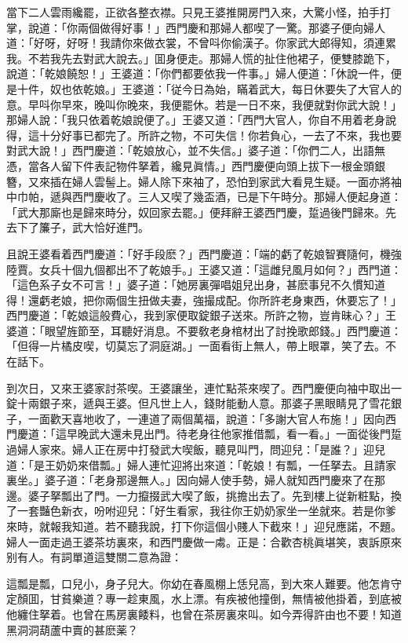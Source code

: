 當下二人雲雨纔罷，正欲各整衣襟。只見王婆推開房門入來，大驚小怪，拍手打掌，說道：「你兩個做得好事！」西門慶和那婦人都喫了一驚。那婆子便向婦人道：「好呀，好呀！我請你來做衣裳，不曾呌你偷漢子。你家武大郎得知，須連累我。不若我先去對武大說去。」囬身便走。那婦人慌的扯住他裙子，便雙膝跪下，說道：「乾娘饒恕！」王婆道：「你們都要依我一件事。」婦人便道：「休說一件，便是十件，奴也依乾娘。」王婆道：「従今日為始，瞞着武大，每日休要失了大官人的意。早呌你早來，晚叫你晚來，我便罷休。若是一日不來，我便就對你武大說！」那婦人說：「我只依着乾娘說便了。」王婆又道：「西門大官人，你自不用着老身說得，這十分好事已都完了。所許之物，不可失信！你若負心，一去了不來，我也要對武大說！」西門慶道：「乾娘放心，並不失信。」婆子道：「你們二人，出語無憑，當各人留下件表記物件拏着，纔見眞情。」西門慶便向頭上拔下一根金頭銀簪，又來插在婦人雲髻上。婦人除下來袖了，恐怕到家武大看見生疑。一面亦將袖中巾帕，遞與西門慶收了。三人又喫了幾盃酒，已是下午時分。那婦人便起身道：「武大那廝也是歸來時分，奴回家去罷。」便拜辭王婆西門慶，踅過後門歸來。先去下了簾子，武大恰好進門。

且說王婆看着西門慶道：「好手段麽？」西門慶道：「端的虧了乾娘智賽隨何，機強陸賈。女兵十個九個都出不了乾娘手。」王婆又道：「這雌兒風月如何？」西門道：「這色系子女不可言！」婆子道：「她房裏彈唱姐兒出身，甚麽事兒不久慣知道得！還虧老娘，把你兩個生扭做夫妻，強撮成配。你所許老身東西，休要忘了！」西門慶道：「乾娘這般費心，我到家便取錠銀子送來。所許之物，豈肯昧心？」王婆道：「眼望旌節至，耳聽好消息。不要敎老身棺材出了討挽歌郎錢。」西門慶道：「但得一片橘皮喫，切莫忘了洞庭湖。」一面看街上無人，帶上眼罩，笑了去。不在話下。

到次日，又來王婆家討茶喫。王婆讓坐，連忙點茶來喫了。西門慶便向袖中取出一錠十兩銀子來，遞與王婆。但凡世上人，錢財能動人意。那婆子黑眼睛見了雪花銀子，一面歡天喜地收了，一連道了兩個萬福，說道：「多謝大官人布施！」因向西門慶道：「這早晚武大還未見出門。待老身往他家推借瓢，看一看。」一面從後門踅過婦人家來。婦人正在房中打發武大喫飯，聽見叫門，問迎兒：「是誰？」迎兒道：「是王奶奶來借瓢。」婦人連忙迎將出來道：「乾娘！有瓢，一任拏去。且請家裏坐。」婆子道：「老身那邊無人。」因向婦人使手勢，婦人就知西門慶來了在那邊。婆子拏瓢出了門。一力攛掇武大喫了飯，挑擔出去了。先到樓上従新粧點，換了一套豔色新衣，吩咐迎兒：「好生看家，我往你王奶奶家坐一坐就來。若是你爹來時，就報我知道。若不聽我說，打下你這個小賤人下截來！」迎兒應諾，不題。婦人一面走過王婆茶坊裏來，和西門慶做一䖏。正是：合歡杏桃眞堪笑，衷訴原來别有人。有詞單道這雙關二意為證：

\begin{myquote}
這瓢是瓢，口兒小，身子兒大。你幼在春風棚上恁兒高，到大來人難要。他怎肯守定顏囬，甘貧樂道？專一趁東風，水上漂。有疾被他撞倒，無情被他掛着，到底被他纏住拏着。也曾在馬房裏餧料，也曾在茶房裏來叫。如今弄得許由也不要！知道黑洞洞葫蘆中賣的甚麽薬？
\end{myquote}

